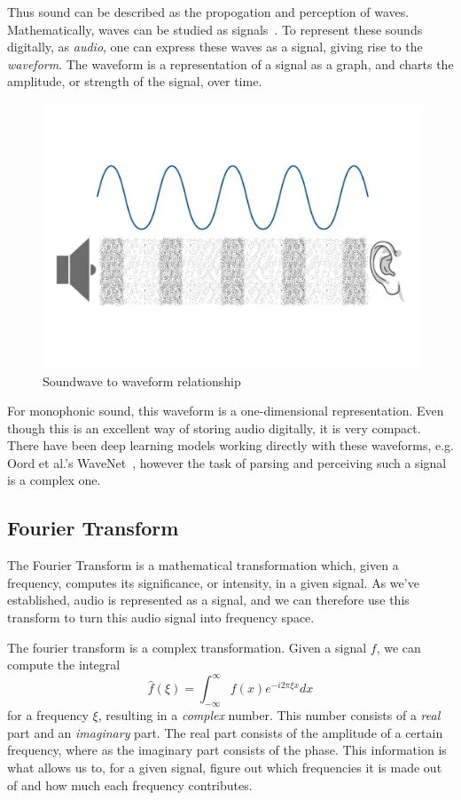 Thus sound can be described as the propogation and perception of waves. Mathematically, waves can be studied as signals~\cite{8454362}. To represent these sounds digitally, as \textit{audio}, one can express these waves as a signal, giving rise to the \textit{waveform}. The waveform is a representation of a signal as a graph, and charts the amplitude, or strength of the signal, over time.

\begin{figure}[H]
    \centering
    \includegraphics[scale=0.3]{figures/waveform}
    \caption{Soundwave to waveform relationship}
    \label{WaveformFigure}
\end{figure}

For monophonic sound, this waveform is a one-dimensional representation. Even though this is an excellent way of storing audio digitally, it is very compact. There have been deep learning models working directly with these waveforms, e.g. Oord et al.'s WaveNet~\cite{oord2016wavenetgenerativemodelraw}, however the task of parsing and perceiving such a signal is a complex one.

\subsection{Fourier Transform}

The Fourier Transform is a mathematical transformation which, given a frequency, computes its significance, or intensity, in a given signal. As we've established, audio is represented as a signal, and we can therefore use this transform to turn this audio signal into frequency space. 

The fourier transform is a complex transformation. Given a signal $f$, we can compute the integral $$ \widehat{f}(\xi) = \int^{\infty}_{-\infty}{f(x)e^{-i2\pi \xi x} dx} $$ for a frequency $\xi$, resulting in a \textit{complex} number. This number consists of a \textit{real} part and an \textit{imaginary} part. The real part consists of the amplitude of a certain frequency, where as the imaginary part consists of the phase. This information is what allows us to, for a given signal, figure out which frequencies it is made out of and how much each frequency contributes.

